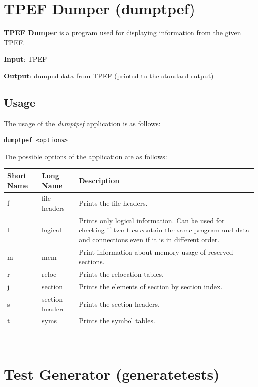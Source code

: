 \documentclass[a4paper,twoside]{tceusermanual}
\begin{document}
\section{TPEF Dumper (dumptpef)}
\label{section:dumptpef}

\textbf{TPEF Dumper} is a program used for displaying information from the
given TPEF.

\textbf{Input}: TPEF

\textbf{Output}: dumped data from TPEF (printed to the standard output)

\subsection{Usage}

The usage of the \emph{dumptpef} application is as follows:

\begin{verbatim}
dumptpef <options>
\end{verbatim}

The possible options of the application are as follows:\\

\begin{tabular}{p{}p{}
                p{}}
\textbf{Short Name} &\textbf{Long Name} &\textbf{Description} \\
\hline
f & file-headers & Prints the file headers. \\
l & logical & Prints only logical information. Can be used for
checking if two files contain the same program and data and connections even if
it is in different order. \\
m & mem & Print information about memory usage of reserved sections. \\
r & reloc & Prints the relocation tables. \\
j & section & Prints the elements of section by section index. \\
s & section-headers & Prints the section headers. \\
t & syms & Prints the symbol tables. \\
\end{tabular}\\



\section{Test Generator (generatetests)}
\label{section:tege}
\end{document}
